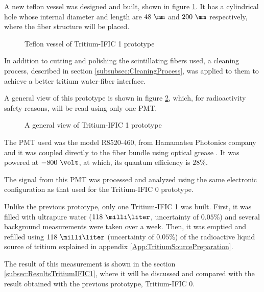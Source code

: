 A new teflon vessel was designed and built, shown in figure \ref{fig:TeflonVesselTritumIFIC1}. It has a cylindrical hole whose internal diameter and length are $48~\mm$ and $200~\mm$ respectively, where the fiber structure will be placed. 

\begin{figure}[h]
 \centering
 \caption{Teflon vessel of Tritium-IFIC 1 prototype}
 \label{fig:TeflonVesselTritumIFIC1}
\end{figure}

In addition to cutting and polishing the scintillating fibers used, a cleaning process, described in section \ref{subsubsec:CleaningProcess}, was applied to them to achieve a better tritium water-fiber interface.

A general view of this prototype is shown in figure \ref{fig:TritumIFIC1}, which, for radioactivity safety reasons, will be read using only one PMT.

\begin{figure}[h]
 \centering
 \caption{A general view of Tritium-IFIC 1 prototype}
 \label{fig:TritumIFIC1}
\end{figure}

The PMT used was the model R8520-460, from Hamamatsu Photonics company \cite{DataSheetPMTs} and it was coupled directly to the fiber bundle using optical grease \cite{OpticalGrease}. It was powered at $-800~\volt$, at which, its quantum efficiency is $28\%$.

The signal from this PMT was processed and analyzed using the same electronic configuration as that used for the Tritium-IFIC 0 prototype.

Unlike the previous prototype, only one Tritium-IFIC 1 was built. First, it was filled with ultrapure water ($118~\milli\liter$, uncertainty of $0.05\%$) and several background measurements were taken over a week. Then, it was emptied and refilled using $118~\milli\liter$ (uncertainty of $0.05\%$) of the radioactive liquid source of tritium explained in appendix \ref{App:TritiumSourcePreparation}.

The result of this measurement is shown in the section \ref{subsec:ResultsTritiumIFIC1}, where it will be discussed and compared with the result obtained with the previous prototype, Tritium-IFIC 0.